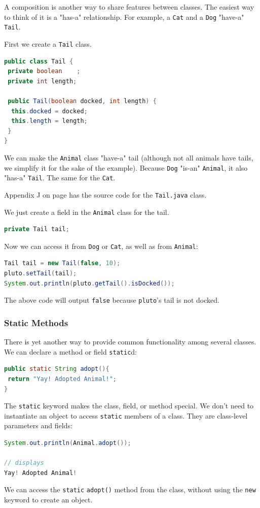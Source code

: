 A composition is another way to share features between classes. The easiest way to think of it is a "has-a" relationship. For example, a \texttt{Cat} and a \texttt{Dog} "have-a" \texttt{Tail}.

First we create a \texttt{Tail} class.
\begin{lstlisting}[language=Java]
public class Tail {
 private boolean 	;
 private int length;

 public Tail(boolean docked, int length) {
  this.docked = docked;
  this.length = length;
 }
}
\end{lstlisting}

We can make the \texttt{Animal} class "have-a" tail (although not all animals have tails, we simplify it for the sake of the example). Because \texttt{Dog} "is-an" \texttt{Animal}, it also "has-a" \texttt{Tail}. The same for the \texttt{Cat}.

Appendix J on page \pageref{App:AppendixJ} has the source code for the  \texttt{Tail.java} class.

We just create a field in the \texttt{Animal} class for the tail.
\begin{lstlisting}[language=Java]
private Tail tail;
\end{lstlisting}

Now we can access it from \texttt{Dog} or \texttt{Cat}, as well as from \texttt{Animal}:
\begin{lstlisting}[language=Java]
Tail tail = new Tail(false, 10);
pluto.setTail(tail);
System.out.println(pluto.getTail().isDocked());
\end{lstlisting}

The above code will output \texttt{false} because \texttt{pluto}'s tail is not docked.

\subsubsection{Static Methods}
There is yet another way to provide common functionality among several classes. We can declare a method or field \texttt{static}d:

\begin{lstlisting}[language=Java]
public static String adopt(){
 return "Yay! Adopted Animal!";
}
\end{lstlisting}

The \texttt{static} keyword makes the class, field, or method special. We don't need to instantiate an object to access \texttt{static} members of a class. They are class-level parameters and fields:
\begin{lstlisting}[language=Java]
System.out.println(Animal.adopt());

// displays
Yay! Adopted Animal!
\end{lstlisting}
We can access the \texttt{static} \texttt{adopt()} method from the class, without using the \texttt{new} keyword to create an object.

